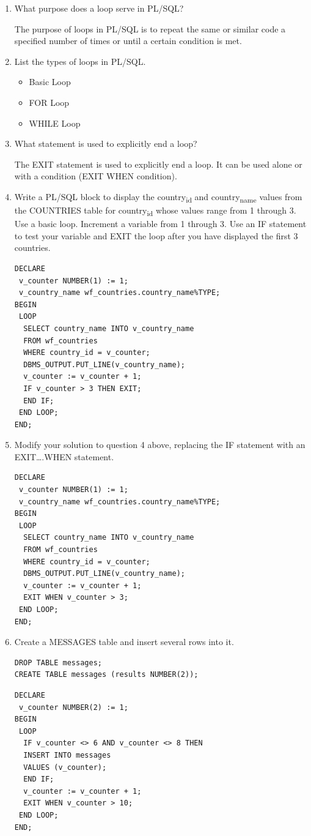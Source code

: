 \documentclass[11pt]{article}
\begin{document}
\begin{enumerate}
\item What purpose does a loop serve in PL/SQL?

The purpose of loops in PL/SQL is to repeat the same or similar code a specified number of times or until a certain condition is met.

\item List the types of loops in PL/SQL.

\begin{itemize}
\item Basic Loop
\item FOR Loop
\item WHILE Loop
\end{itemize}

\item What statement is used to explicitly end a loop?

The EXIT statement is used to explicitly end a loop. It can be used alone or with a condition (EXIT WHEN condition).

\item Write a PL/SQL block to display the country\textsubscript{id} and country\textsubscript{name} values from the COUNTRIES table for country\textsubscript{id} whose values range from 1 through 3. Use a basic loop. Increment a variable from 1 through 3. Use an IF statement to test your variable and EXIT the loop after you have displayed the first 3 countries.
\begin{verbatim}
DECLARE
 v_counter NUMBER(1) := 1;
 v_country_name wf_countries.country_name%TYPE;
BEGIN
 LOOP
  SELECT country_name INTO v_country_name
  FROM wf_countries
  WHERE country_id = v_counter;
  DBMS_OUTPUT.PUT_LINE(v_country_name);
  v_counter := v_counter + 1;
  IF v_counter > 3 THEN EXIT;
  END IF;
 END LOOP;
END;
\end{verbatim}

\item Modify your solution to question 4 above, replacing the IF statement with an EXIT\ldots{}.WHEN statement.
\begin{verbatim}
DECLARE
 v_counter NUMBER(1) := 1;
 v_country_name wf_countries.country_name%TYPE;
BEGIN
 LOOP
  SELECT country_name INTO v_country_name
  FROM wf_countries
  WHERE country_id = v_counter;
  DBMS_OUTPUT.PUT_LINE(v_country_name);
  v_counter := v_counter + 1;
  EXIT WHEN v_counter > 3;
 END LOOP;
END;
\end{verbatim}

\item Create a MESSAGES table and insert several rows into it.
\begin{verbatim}
DROP TABLE messages;
CREATE TABLE messages (results NUMBER(2));
\end{verbatim}

\begin{verbatim}
DECLARE
 v_counter NUMBER(2) := 1;
BEGIN
 LOOP
  IF v_counter <> 6 AND v_counter <> 8 THEN
  INSERT INTO messages
  VALUES (v_counter);
  END IF;
  v_counter := v_counter + 1;
  EXIT WHEN v_counter > 10;
 END LOOP;
END;
\end{verbatim}
\end{enumerate}
\end{document}
